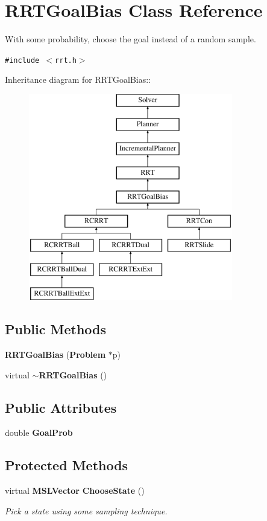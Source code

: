 \section{RRTGoal\-Bias  Class Reference}
\label{classRRTGoalBias}
With some probability, choose the goal instead of a random sample. 


{\tt \#include $<$rrt.h$>$}

Inheritance diagram for RRTGoal\-Bias::\begin{figure}[H]
\begin{center}
\leavevmode
\includegraphics[height=9cm]{classRRTGoalBias}
\end{center}
\end{figure}
\subsection*{Public Methods}
\begin{CompactItemize}
\item 
{\bf RRTGoal\-Bias} ({\bf Problem} $\ast$p)
\item 
virtual {\bf $\sim$RRTGoal\-Bias} ()
\end{CompactItemize}
\subsection*{Public Attributes}
\begin{CompactItemize}
\item 
double {\bf Goal\-Prob}
\end{CompactItemize}
\subsection*{Protected Methods}
\begin{CompactItemize}
\item 
virtual {\bf MSLVector} {\bf Choose\-State} ()
\begin{CompactList}\small\item\em Pick a state using some sampling technique.\item\end{CompactList}\end{CompactItemize}


